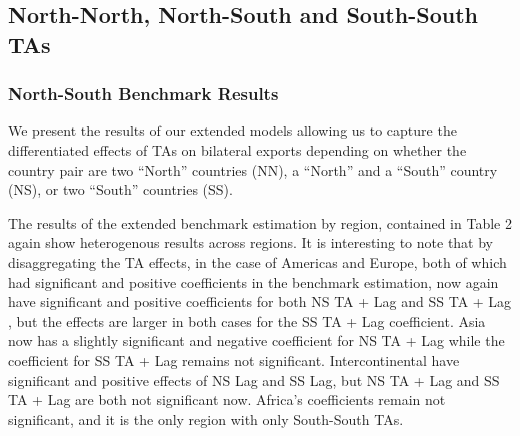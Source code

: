 \documentclass[12pt]{article}%
\begin{document}
%
\FloatBarrier

%
\subsection{North{-}North, North{-}South and South{-}South TAs}%
\label{subsec:North{-}North,North{-}SouthandSouth{-}SouthTAs}%
\subsubsection{North{-}South Benchmark Results}%
\label{ssubsec:North{-}SouthBenchmarkResults}%
We present the results of our extended models allowing us to capture the
differentiated effects of TAs on bilateral exports depending on whether
the country pair are two ``North'' countries (NN), a ``North'' and a
``South'' country (NS), or two ``South'' countries (SS).

The results of the extended benchmark estimation by region, contained in
Table 2 again show heterogenous results across regions. It is
interesting to note that by disaggregating the TA effects, in the case
of Americas and Europe, both of which had significant and positive
coefficients in the benchmark estimation, now again have significant and
positive coefficients for both NS TA + Lag and SS TA + Lag , but the
effects are larger in both cases for the SS TA + Lag coefficient. Asia
now has a slightly significant and negative coefficient for NS TA + Lag
while the coefficient for SS TA + Lag remains not significant.
Intercontinental have significant and positive effects of NS Lag and SS
Lag, but NS TA + Lag and SS TA + Lag are both not significant now.
Africa's coefficients remain not significant, and it is the only region
with only South-South TAs.
%
%
\FloatBarrier

%
\end{document}
